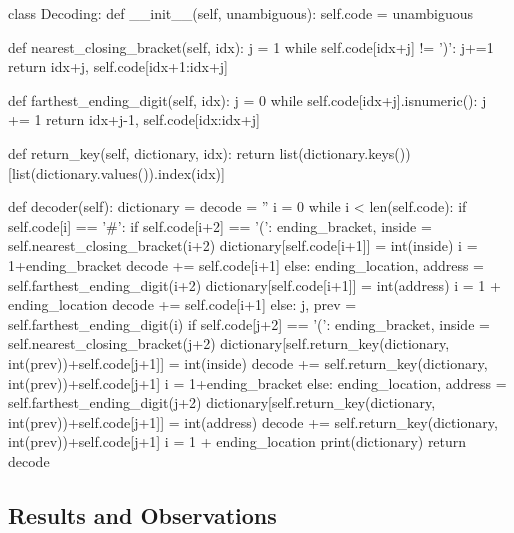 \documentclass[scrartcl]{article}
\begin{document}
\begin{python}
    class Decoding:
        def __init__(self, unambiguous):
            self.code = unambiguous 
        
        def nearest_closing_bracket(self, idx):
            j = 1
            while self.code[idx+j] != ')':
                j+=1
            return idx+j, self.code[idx+1:idx+j]
        
        def farthest_ending_digit(self, idx):
            j = 0
            while self.code[idx+j].isnumeric():
                j += 1
            return idx+j-1, self.code[idx:idx+j]
        
        def return_key(self, dictionary, idx):
            return list(dictionary.keys())[list(dictionary.values()).index(idx)]
        
        def decoder(self):
        dictionary = {}
            decode = ''
            i = 0
            while i < len(self.code):
                if self.code[i] == '#':
                    if self.code[i+2] == '(': 
                        ending_bracket, inside = self.nearest_closing_bracket(i+2)
                        dictionary[self.code[i+1]] = int(inside)
                        i = 1+ending_bracket
                        decode += self.code[i+1]
                    else:
                        ending_location, address = self.farthest_ending_digit(i+2)
                        dictionary[self.code[i+1]] = int(address)
                        i = 1 + ending_location
                        decode += self.code[i+1]
                else:
                    j, prev = self.farthest_ending_digit(i)
                    if self.code[j+2] == '(':
                        ending_bracket, inside = self.nearest_closing_bracket(j+2)
                        dictionary[self.return_key(dictionary, int(prev))+self.code[j+1]] = int(inside)
                        decode += self.return_key(dictionary, int(prev))+self.code[j+1]
                        i = 1+ending_bracket
                    else:
                        ending_location, address = self.farthest_ending_digit(j+2)
                        dictionary[self.return_key(dictionary, int(prev))+self.code[j+1]] = int(address)
                        decode += self.return_key(dictionary, int(prev))+self.code[j+1]
                        i = 1 + ending_location
            print(dictionary)
            return decode    
\end{python}
\subsection{Results and Observations}
\end{document}

